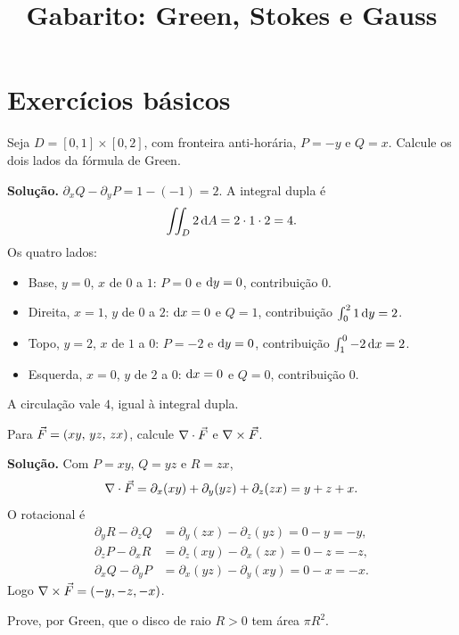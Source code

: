 \documentclass[11pt,a4paper]{article}
\title{Gabarito: Green, Stokes e Gauss}
\author{}
\date{}
\begin{document}
\maketitle
\tableofcontents

\section{Exercícios básicos}

\begin{exercicio}
Seja $D=[0,1]\times[0,2]$, com fronteira anti-horária, $P=-y$ e $Q=x$. Calcule os dois lados da fórmula de Green.
\end{exercicio}

\noindent\textbf{Solução.}
$\partial_x Q-\partial_y P=1-(-1)=2$. A integral dupla é
\[
\iint_D 2\,\mathrm{d} A=2\cdot 1\cdot 2=4.
\]
Os quatro lados:
\begin{itemize}
\item Base, $y=0$, $x$ de $0$ a $1$: $P=0$ e $\mathrm{d} y=0$, contribuição $0$.
\item Direita, $x=1$, $y$ de $0$ a $2$: $\mathrm{d} x=0$ e $Q=1$, contribuição $\int_0^2 1\,\mathrm{d} y=2$.
\item Topo, $y=2$, $x$ de $1$ a $0$: $P=-2$ e $\mathrm{d} y=0$, contribuição $\int_1^0 -2\,\mathrm{d} x=2$.
\item Esquerda, $x=0$, $y$ de $2$ a $0$: $\mathrm{d} x=0$ e $Q=0$, contribuição $0$.
\end{itemize}
A circulação vale $4$, igual à integral dupla.

\begin{exercicio}
Para $\vec{F}=(xy,\, yz,\, zx)$, calcule $\nabla\cdot\vec{F}$ e $\nabla\times\vec{F}$.
\end{exercicio}

\noindent\textbf{Solução.}
Com $P=xy$, $Q=yz$ e $R=zx$,
\[
\nabla\cdot\vec{F}=\partial_x(xy)+\partial_y(yz)+\partial_z(zx)=y+z+x.
\]
O rotacional é
\begin{align*}
\partial_y R-\partial_z Q&=\partial_y(zx)-\partial_z(yz)=0-y=-y,\\
\partial_z P-\partial_x R&=\partial_z(xy)-\partial_x(zx)=0-z=-z,\\
\partial_x Q-\partial_y P&=\partial_x(yz)-\partial_y(xy)=0-x=-x.
\end{align*}
Logo $\nabla\times\vec{F}=(-y,-z,-x)$.

\begin{exercicio}
Prove, por Green, que o disco de raio $R>0$ tem área $\pi R^2$.
\end{exercicio}
\end{document}
